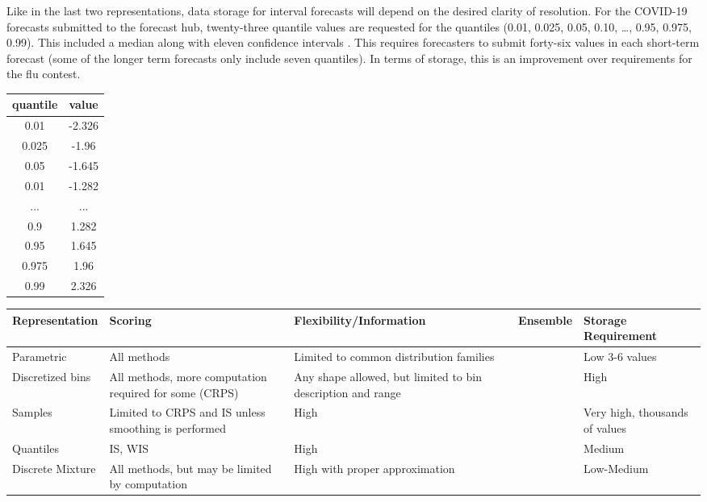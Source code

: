 \documentclass{article}\usepackage[]{graphicx}\usepackage[]{color}
\begin{document}
Like in the last two representations, data storage for interval forecasts will
depend on the desired clarity of resolution. For the COVID-19 forecasts 
submitted to the forecast hub, twenty-three quantile values are requested for 
the quantiles (0.01, 0.025, 0.05, 0.10, …, 0.95, 0.975, 0.99). This included a 
median along with eleven confidence intervals \cite{bracher2021evaluating}. This
requires forecasters to submit forty-six values in each short-term forecast 
(some of the longer term forecasts only include seven quantiles). In terms of 
storage, this is an improvement over requirements for the flu contest. 


\begin{table}[h!]
\centering
 \begin{tabular}{|c|c|} 
 \hline
    quantile & value \\ \hline
    0.01 & -2.326 \\
    0.025 & -1.96 \\
    0.05 & -1.645 \\
    0.01 & -1.282 \\
    ...  & ... \\
    0.9 & 1.282 \\
    0.95 & 1.645 \\
    0.975 & 1.96 \\
    0.99 & 2.326 \\
 \hline
 \end{tabular}
\end{table}


\begin{flushleft}
    \begin{adjustwidth}{-3cm}{-1cm}
    \begin{tabular}{ | p{2.4cm} | p{2cm} | p{4cm} | p{3cm} | l |}
    \hline
    Representation & Scoring & Flexibility/Information & Ensemble &
    Storage Requirement
    \\ \hline

    Parametric & All methods & Limited to common distribution families 
    &  & Low 3-6 values \\ \hline
    
    Discretized bins & All methods, more computation required for some (CRPS) &
    Any shape allowed, but limited to bin description and range & &
    High
    \\ \hline

    Samples & Limited to CRPS and IS unless smoothing is performed & High & & 
    Very high, thousands of values
    \\ \hline

    
    Quantiles & IS, WIS & High & & Medium 
    \\ \hline
    
    Discrete Mixture & All methods, but may be limited by computation & 
    High with proper approximation &
    & Low-Medium
    \\ \hline

	 \end{tabular}
	 \end{adjustwidth}
\end{flushleft}
\end{document}
